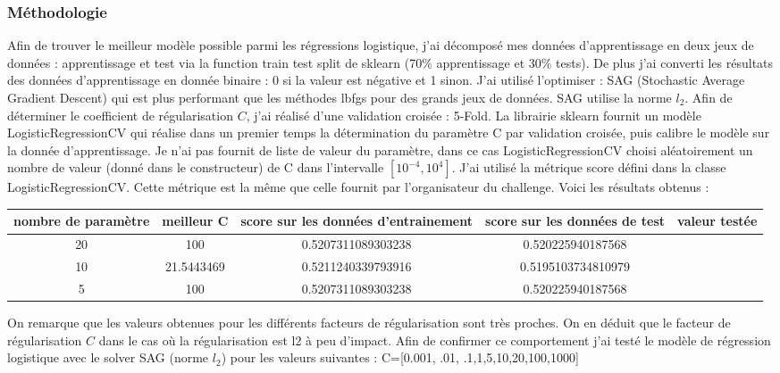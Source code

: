 \documentclass[12pt]{scrartcl} %
\begin{document}
\subsubsection{Méthodologie}
Afin de trouver le meilleur modèle possible parmi les régressions logistique, j'ai décomposé mes données d'apprentissage en deux jeux de données : apprentissage et test via la function train test split de sklearn (70\% apprentissage et 30\% tests). De plus j'ai converti les résultats des données d'apprentissage en donnée binaire : 0 si la valeur est négative et 1 sinon. J'ai utilisé l'optimiser : SAG (Stochastic Average Gradient Descent) qui est plus performant que les méthodes lbfgs pour des grands jeux de données. SAG utilise la norme $l_2$. Afin de déterminer le coefficient de régularisation $C$, j'ai réalisé d'une validation croisée : 5-Fold. La librairie sklearn fournit un modèle LogisticRegressionCV qui réalise dans un premier temps la détermination du paramètre C par validation croisée, puis calibre le modèle sur la donnée d'apprentissage. Je n'ai pas fournit de liste de valeur du paramètre, dans ce cas LogisticRegressionCV choisi aléatoirement un nombre de valeur (donné dans le constructeur) de C dans l'intervalle $[10^{-4},10^4]$. J'ai utilisé la métrique score défini dans la classe LogisticRegressionCV. Cette métrique est la même que celle fournit par l'organisateur du challenge. Voici les résultats obtenus : 
\begin{table}[h]
\centering
\begin{adjustbox}{max width=\textwidth}
\begin{tabular}{|c|c|c|c|c|}
 nombre de paramètre & meilleur C & score sur les données d'entrainement& score sur les données de test & valeur testée\\
\hline
20 & 100 & 0.5207311089303238 & 0.520225940187568 \\
10 & 21.5443469 & 0.5211240339793916 & 0.5195103734810979 \\
5 & 100 &   0.5207311089303238 &  0.520225940187568 
\end{tabular}
\end{adjustbox}
\end{table}
\newline
On remarque que les valeurs obtenues pour les différents facteurs de régularisation sont très proches. On en déduit que le facteur de régularisation $C$ dans le cas où la régularisation est l2 à peu d'impact. Afin de confirmer ce comportement j'ai testé le modèle de régression logistique avec le solver SAG (norme $l_2$) pour les valeurs suivantes : C=[0.001, .01, .1,1,5,10,20,100,1000]
\end{document}
